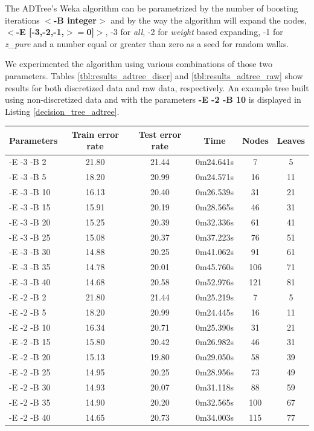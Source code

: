 \documentclass[a4paper]{llncs}
\begin{document}
The ADTree's Weka algorithm can be parametrized by the number of boosting iterations
\textbf{$<$-B integer$>$} and by the way the algorithm will expand the nodes,
\textbf{$<$-E [-3,-2,-1,$>=$0]$>$},
-3 for \textit{all}, -2 for \textit{weight} based expanding,
-1 for \textit{z\_pure} and a number
equal or greater than zero as a seed for random walks.

We experimented the algorithm using various combinations of those two parameters.
Tables \ref{tbl:results_adtree_discr} and \ref{tbl:results_adtree_raw} show
results for both discretized data and raw data, respectively.
An example tree built using non-discretized data and with the parameters \textbf{-E -2 -B 10}
is displayed in Listing \ref{decision_tree_adtree}.

\begin{table}[ht]
  \begin{center}
  \begin{tabular}{ | l | c | c | c | c | c |}
    \hline
    \textbf{Parameters} & \textbf{Train error rate} & \textbf{Test error rate} & \textbf{Time} & \textbf{Nodes} & \textbf{Leaves} \\ \hline
    -E -3 -B 2 & 21.80 & 21.44 & 0m24.641s & 7 & 5 \\ \hline
    -E -3 -B 5 & 18.20 & 20.99 & 0m24.571s & 16 & 11 \\ \hline
    -E -3 -B 10 & 16.13 & 20.40 & 0m26.539s & 31 & 21 \\ \hline
    -E -3 -B 15 & 15.91 & 20.19 & 0m28.565s & 46 & 31 \\ \hline
    -E -3 -B 20 & 15.25 & 20.39 & 0m32.336s & 61 & 41 \\ \hline
    -E -3 -B 25 & 15.08 & 20.37 & 0m37.223s & 76 & 51 \\ \hline
    -E -3 -B 30 & 14.88 & 20.25 & 0m41.062s & 91 & 61 \\ \hline
    -E -3 -B 35 & 14.78 & 20.01 & 0m45.760s & 106 & 71 \\ \hline
    -E -3 -B 40 & 14.68 & 20.58 & 0m52.976s & 121 & 81 \\ \hline
    
    -E -2 -B 2 & 21.80 & 21.44 & 0m25.219s & 7 & 5 \\ \hline
    -E -2 -B 5 & 18.20 & 20.99 & 0m24.445s & 16 & 11 \\ \hline
    -E -2 -B 10 & 16.34 & 20.71 & 0m25.390s & 31 & 21 \\ \hline
    -E -2 -B 15 & 15.80 & 20.42 & 0m26.982s & 46 & 31 \\ \hline
    -E -2 -B 20 & 15.13 & 19.80 & 0m29.050s & 58 & 39 \\ \hline
    -E -2 -B 25 & 14.95 & 20.25 & 0m28.956s & 73 & 49 \\ \hline
    -E -2 -B 30 & 14.93 & 20.07 & 0m31.118s & 88 & 59 \\ \hline
    -E -2 -B 35 & 14.90 & 20.20 & 0m32.565s & 100 & 67 \\ \hline
    -E -2 -B 40 & 14.65 & 20.73 & 0m34.003s & 115 & 77 \\ \hline
    

\end{tabular}
\end{center}
\end{table}
\end{document}

